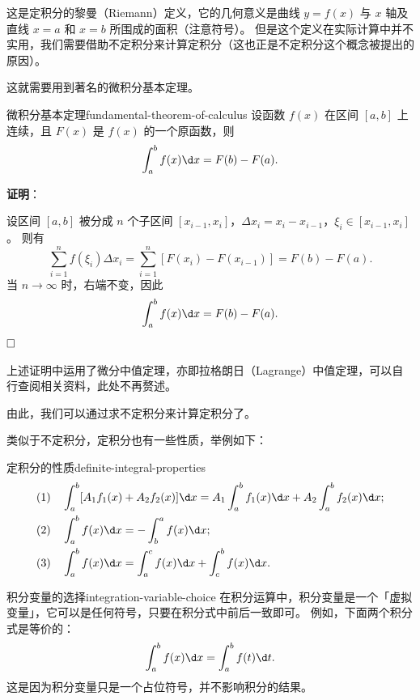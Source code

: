 这是定积分的黎曼（Riemann）定义，它的几何意义是曲线 $ y = f(x) $ 与 $ x $ 轴及直线 $ x = a $ 和 $ x = b $ 所围成的面积（注意符号）。
但是这个定义在实际计算中并不实用，我们需要借助不定积分来计算定积分（这也正是不定积分这个概念被提出的原因）。

这就需要用到著名的微积分基本定理。

\begin{theorem}{微积分基本定理}{fundamental-theorem-of-calculus}
    设函数 $ f(x) $ 在区间 $ [a, b] $ 上连续，且 $ F(x) $ 是 $ f(x) $ 的一个原函数，则
    \begin{equation}
        \int_a^b f(x) \d x = F(b) - F(a).
    \end{equation}

    \textbf{证明}：

    设区间 $ [a, b] $ 被分成 $ n $ 个子区间 $ [x_{i-1}, x_i] $，$ \Delta x_i = x_i - x_{i-1} $，$ \xi_i \in [x_{i-1}, x_i] $。
    则有
    \begin{equation*}
        \sum_{i=1}^n f(\xi_i) \Delta x_i = \sum_{i=1}^n [F(x_i) - F(x_{i-1})] = F(b) - F(a).
    \end{equation*}
    当 $ n \to \infty $ 时，右端不变，因此
    \begin{equation*}
        \int_a^b f(x) \d x = F(b) - F(a).
    \end{equation*}
    $\hfill\square$

    上述证明中运用了微分中值定理，亦即拉格朗日（Lagrange）中值定理，可以自行查阅相关资料，此处不再赘述。
\end{theorem}

由此，我们可以通过求不定积分来计算定积分了。

类似于不定积分，定积分也有一些性质，举例如下：
\begin{physlist}{定积分的性质}{definite-integral-properties}
    \begin{align}
         & (1)\quad \int_a^b [A_1 f_1(x) + A_2 f_2(x)] \d x = A_1 \int_a^b f_1(x) \d x + A_2 \int_a^b f_2(x) \d x ; \\
         & (2)\quad \int_a^b f(x) \d x = -\int_b^a f(x) \d x ;                                                      \\
         & (3)\quad \int_a^b f(x) \d x = \int_a^c f(x) \d x + \int_c^b f(x) \d x .
    \end{align}
\end{physlist}

\begin{note}{积分变量的选择}{integration-variable-choice}
    在积分运算中，积分变量是一个「虚拟变量」，它可以是任何符号，只要在积分式中前后一致即可。
    例如，下面两个积分式是等价的：
    \begin{equation*}
        \int_a^b f(x) \d x = \int_a^b f(t) \d t .
    \end{equation*}
    这是因为积分变量只是一个占位符号，并不影响积分的结果。
\end{note}

